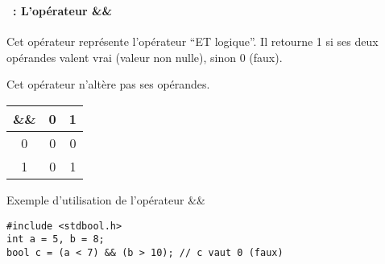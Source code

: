 \begin{frame}[containsverbatim]
  \frametitle{\secname}
  \framesubtitle{\subsecname~: L'opérateur \&\&} 

  Cet opérateur représente l'opérateur ``ET logique''. Il retourne 1 si ses deux opérandes valent vrai (valeur non nulle), sinon 0 (faux).
  \par
  Cet opérateur n'altère pas ses opérandes.
  \vspace{0.5cm}
    \begin{center}
    \begin{tabular}{|c|c|c|}
      \hline
      \&\& & 0 & 1 \\
      \hline
      0  & 0 & 0 \\
      \hline
      1  & 0 & 1 \\
      \hline
    \end{tabular}
  \end{center}
  \begin{exampleblock}{Exemple d'utilisation de l'opérateur \&\&}
    \begin{verbatim}
#include <stdbool.h>
int a = 5, b = 8;
bool c = (a < 7) && (b > 10); // c vaut 0 (faux)
    \end{verbatim}
  \end{exampleblock}
\end{frame}

